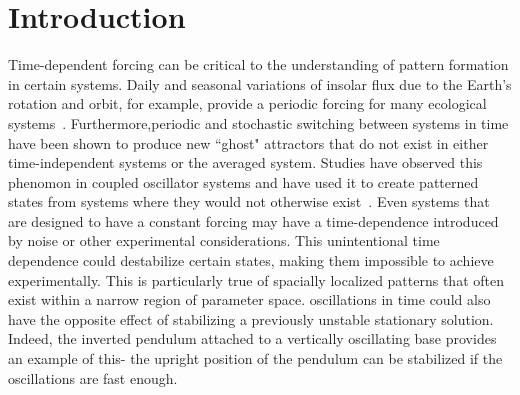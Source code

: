 \documentclass[../main/TimeForcingSHE.tex]{subfiles}
\begin{document}
\section{Introduction}

Time-dependent forcing can be critical to the understanding of pattern formation in certain systems.  Daily and seasonal variations of insolar flux due to the Earth's rotation and orbit, for example, provide a periodic forcing for many ecological systems~\cite{kletter2012ostwald,tlidi2008vegetation,meron2012pattern,sherratt2010pattern,sherratt2005analysis}.   Furthermore,periodic and stochastic switching between systems in time  have been shown to produce new ``ghost" attractors that do not exist in either time-independent systems or the averaged system.  Studies  have observed this phenomon in coupled oscillator systems\cite{belykh2013multistable} and have used it to create patterned states from systems where they would not otherwise exist~\cite{buceta2001stationary}.   Even systems that are designed to have a constant forcing may have a time-dependence introduced by noise or other experimental considerations.  This unintentional time dependence could destabilize certain states, making them impossible to achieve experimentally.  This is particularly true of spacially localized patterns that often exist within a narrow region of parameter space.  oscillations in time  could also have the opposite effect of stabilizing a previously unstable stationary solution. Indeed, the inverted pendulum attached to a vertically oscillating base provides an example of this- the upright position of the pendulum can be stabilized if the oscillations are fast enough.  

\end{document}
